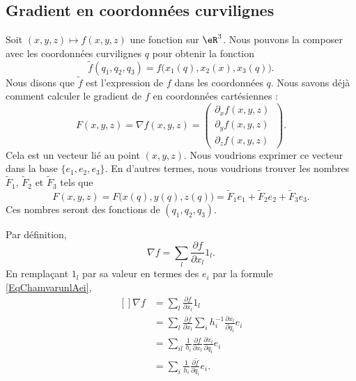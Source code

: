 \subsection{Gradient en coordonnées curvilignes}

Soit $(x,y,z)\mapsto f(x,y,z)$ une fonction sur $\eR^3$. Nous pouvons la composer avec les coordonnées curvilignes $q$ pour obtenir la fonction
\begin{equation}
    \tilde f(q_1,q_2,q_3)=f\big( x_1(q),x_2(x),x_3(q) \big).
\end{equation}
Nous disons que $\tilde f$ est l'expression de $f$ dans les coordonnées $q$. Nous savons déjà comment calculer le gradient de $f$ en coordonnées cartésiennes :
\begin{equation}
    F(x,y, z)=\nabla f(x,y,z)=\begin{pmatrix}
        \partial_xf(x,y,z)    \\
        \partial_yf(x,y,z)    \\
        \partial_zf(x,y,z)    \
    \end{pmatrix}.
\end{equation}
Cela est un vecteur lié au point $(x,y,z)$. Nous voudrions exprimer ce vecteur dans la base $\{ e_1,e_2,e_3 \}$. En d'autres termes, nous voudrions trouver les nombres $\tilde F_1$, $\tilde F_2$ et $\tilde F_3$ tels que
\begin{equation}
    F(x,y,z)=F\big( x(q),y(q),z(q) \big)=\tilde F_1e_1+\tilde F_2e_2+\tilde F_3e_3.
\end{equation}
Ces nombres seront des fonctions de $(q_1,q_2,q_3)$.

Par définition,
\begin{equation}
    \nabla f=\sum_l\frac{ \partial f }{ \partial x_l }1_l.
\end{equation}
En remplaçant $1_l$ par sa valeur en termes des $e_i$ par la formule \eqref{EqChamvarunlAei},
\begin{equation}
    \begin{aligned}[]
        \nabla f&=\sum_l\frac{ \partial f }{ \partial x_l }1_l\\
        &=\sum_l\frac{ \partial f }{ \partial x_l }\sum_ih_i^{-1}\frac{ \partial x_l }{ \partial q_i }e_i\\
        &=\sum_{il}\frac{1}{ h_i }\frac{ \partial f }{ \partial x_l }\frac{ \partial x_l }{ \partial q_i }e_i\\
        &=\sum_i\frac{1}{ h_i }\frac{ \partial \tilde f }{ \partial q_i }e_i.
    \end{aligned}
\end{equation}

